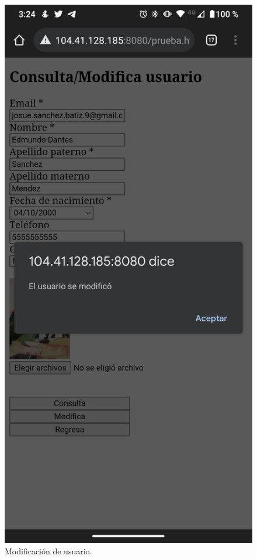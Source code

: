 \documentclass[11pt]{article}
\begin{document}
		\begin{figure}[H]
			\centering
			\includegraphics[scale=0.18]{resources/Screenshot_20211024-152418.png}
			\caption{Modificación de usuario.}\label{fig:picture}
		\end{figure}
\end{document}
